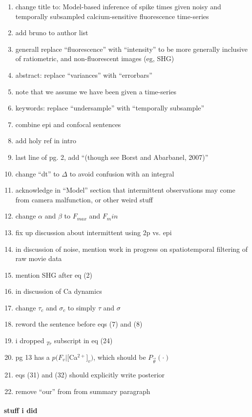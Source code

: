 \documentclass{article}
\begin{document}
\begin{enumerate}
\item change title to: Model-based inference of spike times given noisy and temporally subsampled calcium-sensitive fluorescence time-series
\item add bruno to author list
\item generall replace ``fluorescence'' with ``intensity'' to be more generally inclusive of ratiometric, and non-fluorescent images (eg, SHG)
\item abstract: replace ``variances'' with ``errorbars''
\item note that we assume we have been given a time-series
\item keywords: replace ``undersample'' with ``temporally subsample''
\item combine epi and confocal sentences
\item add holy ref in intro 
\item last line of pg. 2, add ``(though see Borst and Abarbanel, 2007)''
\item change ``dt'' to $\Delta$ to avoid confusion with an integral
\item acknowledge in ``Model'' section that intermittent observations may come from camera malfunction, or other weird stuff
\item change $\alpha$ and $\beta$ to $F_{max}$ and $F_min$
\item fix up discussion about intermittent using 2p vs. epi
\item in discussion of noise, mention work in progress on spatiotemporal filtering of raw movie data
\item mention SHG after eq (2)
\item in discussion of Ca dynamics
\item change $\tau_c$ and $\sigma_c$ to simply $\tau$ and $\sigma$
\item reword the sentence before eqs (7) and (8)
\item i dropped $_{Tr}$ subscript in eq (24)
\item pg 13 has a $p(F_v|[$Ca$^{2+}]_v)$, which should be $P_{\vec{\theta}}(\cdot)$ 
\item eqs (31) and (32) should explicitly write posterior%
\item remove ``our'' from from summary paragraph 
\end{enumerate}


\paragraph{stuff i did}
\end{document}
